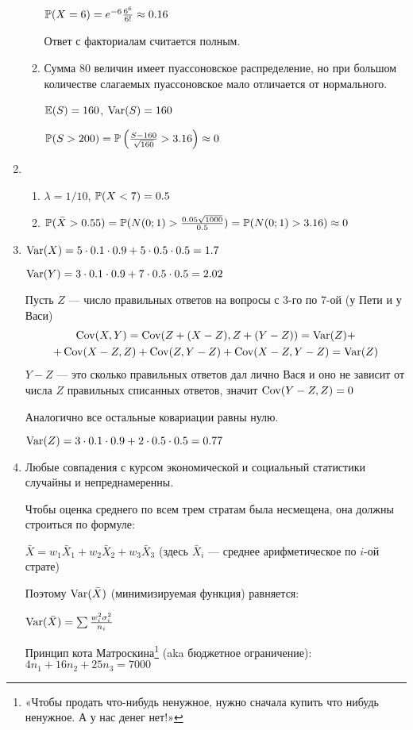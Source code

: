 \begin{enumerate}
\begin{enumerate}
$\P(X=6)=e^{-6}\frac{6^6}{6!}\approx 0.16$

Ответ с факториалам считается полным.
\item Сумма 80 величин имеет пуассоновское распределение, но при большом количестве слагаемых пуассоновское мало отличается от нормального.

$\E(S)=160$, $\Var(S)=160$

$\P(S>200)=\P\left(\frac{S-160}{\sqrt{160}}>3.16\right)\approx 0$
\end{enumerate}
\item
\begin{enumerate}
\item $\lambda=1/10$, $\P(X<7)=0.5$
\item $\P(\bar{X}>0.55)=\P(N(0;1)>\frac{0.05\sqrt{1000}}{0.5})=\P(N(0;1)>3.16)\approx 0$
\end{enumerate}
\item $\Var(X)=5\cdot 0.1\cdot 0.9+5\cdot 0.5\cdot 0.5=1.7$

$\Var(Y)=3\cdot 0.1\cdot 0.9+7\cdot 0.5\cdot 0.5=2.02$

Пусть $Z$ — число правильных ответов на вопросы с 3-го по 7-ой (у Пети и у Васи)
\begin{multline*}
\Cov(X,Y)=\Cov(Z+(X-Z),Z+(Y-Z))=\Var(Z)+ \\
+ \Cov(X-Z,Z)+\Cov(Z,Y-Z)+\Cov(X-Z,Y-Z)=\Var(Z)
\end{multline*}
$Y-Z$ — это сколько правильных ответов дал лично Вася и оно не зависит от числа $Z$ правильных списанных ответов, значит $\Cov(Y-Z,Z)=0$

Аналогично все остальные ковариации равны нулю.

$\Var(Z)=3\cdot 0.1\cdot 0.9+2\cdot 0.5\cdot 0.5=0.77$
\item Любые совпадения с курсом экономической и социальный статистики случайны и непреднамеренны.

Чтобы оценка среднего по всем трем стратам была несмещена, она должны строиться по формуле:

$\bar{X}=w_{1}\bar{X}_{1}+w_{2}\bar{X}_{2}+w_{3}\bar{X}_{3}$ (здесь $\bar{X}_{i}$ — среднее арифметическое по $i$-ой страте)

Поэтому $\Var(\bar{X})$ (минимизируемая функция) равняется:

$\Var(\bar{X})=\sum \frac{w^{2}_{i}\sigma^{2}_{i}}{n_{i}}$

Принцип кота Матроскина\footnote{«Чтобы продать что-нибудь ненужное, нужно сначала купить что нибудь ненужное. А у нас денег нет!»} (aka бюджетное ограничение):  $4n_{1}+16n_{2}+25n_{3}=7000$


\end{enumerate}
